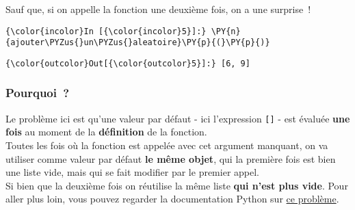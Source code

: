     Sauf que, si on appelle la fonction une deuxième fois, on a une
surprise~!

    \begin{Verbatim}[commandchars=\\\{\}]
{\color{incolor}In [{\color{incolor}5}]:} \PY{n}{ajouter\PYZus{}un\PYZus{}aleatoire}\PY{p}{(}\PY{p}{)}
\end{Verbatim}


\begin{Verbatim}[commandchars=\\\{\}]
{\color{outcolor}Out[{\color{outcolor}5}]:} [6, 9]
\end{Verbatim}
            
    \hypertarget{pourquoi}{%
\subsubsection{Pourquoi~?}\label{pourquoi}}

    Le problème ici est qu'une valeur par défaut - ici l'expression
\texttt{{[}{]}} - est évaluée \textbf{une fois} au moment de la
\textbf{définition} de la fonction.\\

Toutes les fois où la fonction est appelée avec cet argument manquant,
on va utiliser comme valeur par défaut \textbf{le même objet}, qui la
première fois est bien une liste vide, mais qui se fait modifier par le
premier appel.\\

Si bien que la deuxième fois on réutilise la même liste \textbf{qui
n'est plus vide}. Pour aller plus loin, vous pouvez regarder la
documentation Python sur
\href{https://docs.python.org/3/faq/programming.html\#why-are-default-values-shared-between-objects}{ce
problème}.